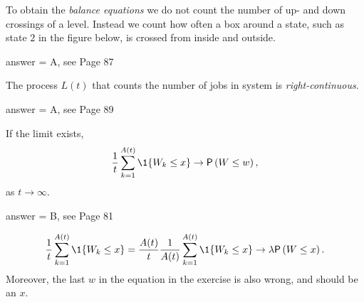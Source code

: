 \begin{exercise}[201802]
To obtain the \emph{ balance equations} we do not count the number of up- and down crossings of a level. Instead we count how often a box around a state, such as state $2$ in the figure below, is crossed from inside and outside. 

\begin{center}
  \end{center}
\begin{solution}
answer = A, see Page 87
\end{solution}
\end{exercise}

\begin{exercise}[201802]
The process  $L(t)$ that counts the number of jobs in system is \emph{right-continuous}.
\begin{solution}
answer = A, see Page 89
\end{solution}
\end{exercise}


\begin{exercise}[201803]
If the limit exists, 
\begin{equation*}
  \frac{1}{t} \sum_{k=1}^{A(t)} \1{W_k \leq x} \to \P{W\leq w},
\end{equation*}
as $t\to \infty$. 
\begin{solution}
answer = B, see Page 81

\begin{equation*}
  \frac{1}{t} \sum_{k=1}^{A(t)} \1{W_k \leq x}  = 
  \frac{A(t)}{t} \frac 1{A(t)}\sum_{k=1}^{A(t)} \1{W_k \leq x} \to \lambda \P{W\leq x}.
\end{equation*}
Moreover, the last $w$ in the equation in the exercise is also wrong, and should be an $x$.
\end{solution}
\end{exercise}

